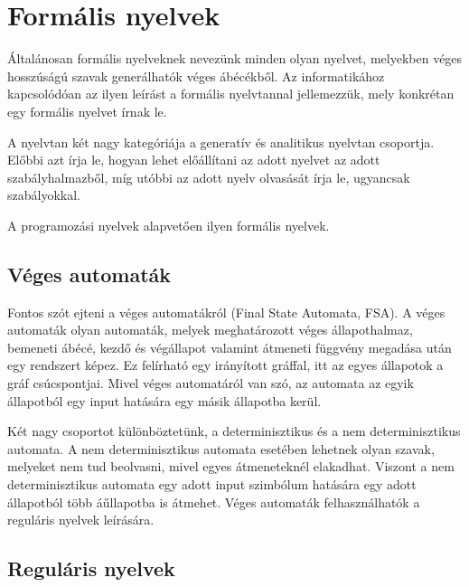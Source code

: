 
\section{Formális nyelvek}


Általánosan formális nyelveknek nevezünk minden olyan nyelvet, melyekben véges hosszúságú szavak generálhatók véges ábécékből. Az informatikához kapcsolódóan az ilyen leírást a formális nyelvtannal jellemezzük, mely konkrétan egy formális nyelvet írnak le.

A nyelvtan két nagy kategóriája a generatív és analitikus nyelvtan csoportja. Előbbi azt írja le, hogyan lehet előállítani az adott nyelvet az adott szabályhalmazből, míg utóbbi az adott nyelv olvasását írja le, ugyancsak szabályokkal.

A programozási nyelvek alapvetően ilyen formális nyelvek.


\subsection{Véges automaták}

Fontos szót ejteni a véges automatákról (Final State Automata, FSA). A véges automaták olyan automaták, melyek meghatározott véges állapothalmaz, bemeneti ábécé, kezdő és végállapot valamint átmeneti függvény megadása után egy rendszert képez. Ez felírható egy irányított gráffal, itt az egyes állapotok a gráf csúcspontjai. Mivel véges automatáról van szó, az automata az egyik állapotból egy input hatására egy másik állapotba kerül.

Két nagy csoportot különböztetünk, a determinisztikus és a nem determinisztikus automata. A nem determinisztikus automata esetében lehetnek olyan szavak, melyeket nem tud beolvasni, mivel egyes átmeneteknél elakadhat. Viszont a nem determinisztikus automata egy adott input szimbólum hatására egy adott állapotból több áűllapotba is átmehet. Véges automaták felhasználhatók a reguláris nyelvek leírására.


\subsection{Reguláris nyelvek}

